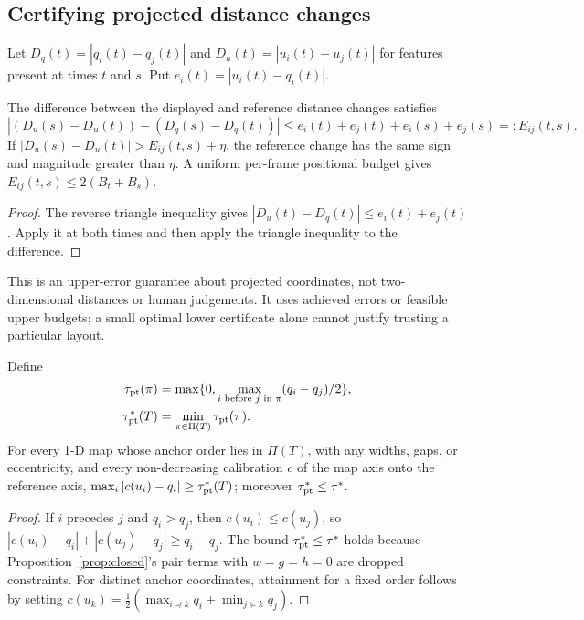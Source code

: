 \subsection{Certifying projected distance changes}
Let $D_q(t)=|q_i(t)-q_j(t)|$ and $D_u(t)=|u_i(t)-u_j(t)|$ for features present at times $t$ and $s$. Put $e_i(t)=|u_i(t)-q_i(t)|$.
\begin{proposition}
The difference between the displayed and reference distance changes satisfies
\[ |(D_u(s)-D_u(t))-(D_q(s)-D_q(t))|\le e_i(t)+e_j(t)+e_i(s)+e_j(s)=:E_{ij}(t,s). \]
If $|D_u(s)-D_u(t)|>E_{ij}(t,s)+\eta$, the reference change has the same sign and magnitude greater than $\eta$. A uniform per-frame positional budget gives $E_{ij}(t,s)\le2(B_t+B_s)$.
\end{proposition}
\begin{proof}The reverse triangle inequality gives $|D_u(t)-D_q(t)|\le e_i(t)+e_j(t)$. Apply it at both times and then apply the triangle inequality to the difference.\end{proof}
\begin{remark}This is an upper-error guarantee about projected coordinates, not two-dimensional distances or human judgements. It uses achieved errors or feasible upper budgets; a small optimal lower certificate alone cannot justify trusting a particular layout.\end{remark}

\begin{proposition}\label{prop:ptcert}
Define
\begin{align*}
\tau_{\rm pt}(\pi)&=\max\{0,\max_{i\text{ before }j\text{ in }\pi}(q_i-q_j)/2\},\\
\tau^*_{\rm pt}(T)&=\min_{\pi\in\Pi(T)}\tau_{\rm pt}(\pi).
\end{align*} For every 1-D map whose anchor order lies in $\Pi(T)$, with any widths, gaps, or eccentricity, and every non-decreasing calibration $c$ of the map axis onto the reference axis, $\max_i|c(u_i)-q_i|\ge\tau^*_{\rm pt}(T)$; moreover $\tau^*_{\rm pt}\le\tau^*$.
\end{proposition}
\begin{proof}If $i$ precedes $j$ and $q_i>q_j$, then $c(u_i)\le c(u_j)$, so $|c(u_i)-q_i|+|c(u_j)-q_j|\ge q_i-q_j$. The bound $\tau^*_{\rm pt}\le\tau^*$ holds because Proposition~\ref{prop:closed}'s pair terms with $w=g=h=0$ are dropped constraints. For distinct anchor coordinates, attainment for a fixed order follows by setting $c(u_k)=\frac12(\max_{i\preceq k}q_i+\min_{j\succeq k}q_j)$.\end{proof}
